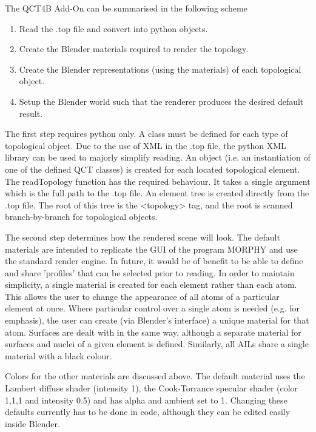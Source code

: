 \documentclass{report}
\begin{document}
The QCT4B Add-On can be summarised in the following scheme

\begin{enumerate}

  \item Read the .top file and convert into python objects.
  \item Create the Blender materials required to render the topology.
  \item Create the Blender representations (using the materials) of each topological object.
  \item Setup the Blender world such that the renderer produces the desired default result.

\end{enumerate}

The first step requires python only. A class must be defined for each type of topological object.
Due to the use of XML in the .top file, the python XML library can be used to majorly simplify reading.
An object (i.e. an instantiation of one of the defined QCT classes) is created for each located topological element.
The readTopology function has the required behaviour. It takes a single argument which is the full path to the .top file.
An element tree is created directly from the .top file. The root of this tree is the <topology> tag, and the root is scanned branch-by-branch for topological objects.


The second step determines how the rendered scene will look.
The default materials are intended to replicate the GUI of the program MORPHY and use the standard render engine.
In future, it would be of benefit to be able to define and share 'profiles' that can be selected prior to reading.
In order to maintain simplicity, a single material is created for each element rather than each atom.
This allows the user to change the appearance of all atoms of a particular element at once.
Where particular control over a single atom is needed (e.g. for emphasis), the user can create (via Blender's interface) a unique material for that atom.
Surfaces are dealt with in the same way, although a separate material for surfaces and nuclei of a given element is defined.
Similarly, all AILs share a single material with a black colour.

Colors for the other materials are discussed above. The default material uses the Lambert diffuse shader (intensity 1), 
the Cook-Torrance specular shader (color 1,1,1 and intensity 0.5) and has alpha and ambient set to 1.
Changing these defaults currently has to be done in code, although they can be edited easily inside Blender.
\end{document}
